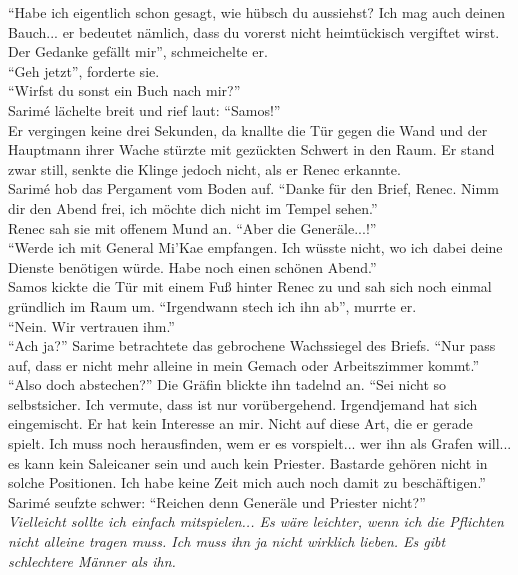 ``Habe ich eigentlich schon gesagt, wie hübsch du aussiehst? Ich mag auch deinen Bauch... er 
bedeutet nämlich, dass du vorerst nicht heimtückisch vergiftet wirst. Der Gedanke gefällt mir'', 
schmeichelte er.\\
``Geh jetzt'', forderte sie.\\
``Wirfst du sonst ein Buch nach mir?''\\
Sarimé lächelte breit und rief laut: ``Samos!''\\
Er vergingen keine drei Sekunden, da knallte die Tür gegen die Wand und der Hauptmann ihrer Wache 
stürzte mit gezückten Schwert in den Raum. Er stand zwar still, senkte die Klinge jedoch nicht, als 
er Renec erkannte.\\
Sarimé hob das Pergament vom Boden auf. ``Danke für den Brief, Renec. Nimm dir den Abend frei, ich 
möchte dich nicht im Tempel sehen.''\\
Renec sah sie mit offenem Mund an. ``Aber die Generäle...!''\\
``Werde ich mit General Mi'Kae empfangen. Ich wüsste nicht, wo ich dabei deine Dienste benötigen 
würde. Habe noch einen schönen Abend.''\\
Samos kickte die Tür mit einem Fuß hinter Renec zu und sah sich noch einmal gründlich im Raum um. 
``Irgendwann stech ich ihn ab'', murrte er.\\
``Nein. Wir vertrauen ihm.''\\
``Ach ja?''
Sarime betrachtete das gebrochene Wachssiegel des Briefs. ``Nur pass auf, dass er nicht mehr 
alleine in mein Gemach oder Arbeitszimmer kommt.''\\
``Also doch abstechen?''
Die Gräfin blickte ihn tadelnd an. ``Sei nicht so selbstsicher. Ich vermute, dass ist nur 
vorübergehend. Irgendjemand hat sich eingemischt. Er hat kein Interesse an mir. Nicht auf diese 
Art, die er gerade spielt. Ich muss noch herausfinden, wem er es vorspielt... wer ihn als Grafen 
will... es kann kein Saleicaner sein und auch kein Priester. Bastarde gehören nicht in solche 
Positionen. Ich habe keine Zeit mich auch noch damit zu beschäftigen.'' Sarimé seufzte schwer: 
``Reichen denn Generäle und Priester nicht?''\\
\textit{Vielleicht sollte ich einfach mitspielen... Es wäre leichter, wenn ich die Pflichten nicht 
alleine tragen muss. Ich muss ihn ja nicht wirklich lieben. Es gibt schlechtere Männer als ihn.}\\


